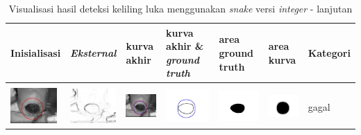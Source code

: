 \begin{table}[H]
	\centering
	\caption{Visualisasi hasil deteksi keliling luka menggunakan \emph{snake} versi \emph{integer} - lanjutan}
	\label{tabel_hasil_2}
	\begin{tabular}{|m{0.7in}|m{0.7in}|m{0.7in}|m{0.7in}|m{0.7in}|m{0.7in}|m{0.7in}|}
		\hline
		\textbf{Inisialisasi} & \textbf{\emph{Eksternal}} & \textbf{kurva akhir} & \textbf{kurva akhir \& \emph{ground truth}}& \textbf{area ground truth} & \textbf{area kurva} & \textbf{Kategori} \\
		\hline
		
		&  &  & & & &  \\
		\includegraphics[width=0.7in]{dataset/dataset_3/luka_hitam/ready/6_integer_init.jpg}&
		\includegraphics[width=0.7in]{dataset/dataset_3/luka_hitam/ready/6_integer_ext.jpg}&
		\includegraphics[width=0.7in]{dataset/dataset_3/luka_hitam/ready/6_integer_result.jpg}&
		\includegraphics[width=0.7in]{dataset/dataset_3/luka_hitam/ready/6_gt_r_integer.jpg}&
		\includegraphics[width=0.7in]{dataset/dataset_3/luka_hitam/ready/6_r.jpg}&
		\includegraphics[width=0.7in]{dataset/dataset_3/luka_hitam/ready/6_integer_r.jpg}&
		gagal\\
		\hline
		

\end{tabular}
\end{table}
